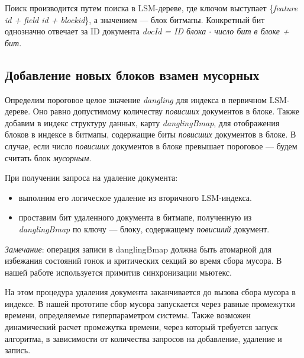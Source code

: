 Поиск производится путем поиска в LSM-дереве, где ключом выступает
\{\textit{feature id + field id + blockid}\}, а значением — блок битмапы.
Конкретный бит однозначно отвечает за ID документа \textit{docId = ID блока
$\cdot$ число бит в блоке + бит}.

\subsection{Добавление новых блоков взамен мусорных}

Определим пороговое целое значение \textit{dangling} для индекса в первичном
LSM-дереве. Оно равно допустимому количеству \textit{повисших} документов в
блоке. Также добавим в индекс структуру данных, карту \textit{danglingBmap}, для
отображения блоков в индексе в битмапы, содержащие биты \textit{повисших}
документов в блоке. В случае, если число \textit{повисших} документов в блоке
превышает пороговое — будем считать блок \textit{мусорным}.

При получении запроса на удаление документа:
\begin{itemize}
    \item выполним его логическое удаление из вторичного LSM-индекса.
    \item проставим бит удаленного документа в битмапе, полученную из
    \textit{danglingBmap} по ключу — блоку, содержащему \textit{повисший} документ.
\end{itemize}

\textit{Замечание}: операция записи в danglingBmap должна быть атомарной для 
избежания состояний гонок и критических секций во время сбора мусора. В нашей
работе используется примитив синхронизации мьютекс.

На этом процедура удаления документа заканчивается до вызова сбора мусора в индексе.
В нашей прототипе сбор мусора запускается через равные промежутки времени, определяемые 
гиперпараметром системы. Также возможен динамический расчет промежутка времени,
через который требуется запуск алгоритма, в зависимости от количества запросов на
добавление, удаление и запись.

